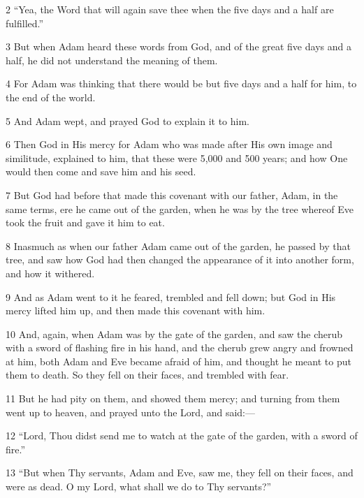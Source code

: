 \par 2 “Yea, the Word that will again save thee when the five days and a half are fulfilled.”

\par 3 But when Adam heard these words from God, and of the great five days and a half, he did not understand the meaning of them.

\par 4 For Adam was thinking that there would be but five days and a half for him, to the end of the world.

\par 5 And Adam wept, and prayed God to explain it to him.

\par 6 Then God in His mercy for Adam who was made after His own image and similitude, explained to him, that these were 5,000 and 500 years; and how One would then come and save him and his seed.

\par 7 But God had before that made this covenant with our father, Adam, in the same terms, ere he came out of the garden, when he was by the tree whereof Eve took the fruit and gave it him to eat.

\par 8 Inasmuch as when our father Adam came out of the garden, he passed by that tree, and saw how God had then changed the appearance of it into another form, and how it withered.

\par 9 And as Adam went to it he feared, trembled and fell down; but God in His mercy lifted him up, and then made this covenant with him.

\par 10 And, again, when Adam was by the gate of the garden, and saw the cherub with a sword of flashing fire in his hand, and the cherub grew angry and frowned at him, both Adam and Eve became afraid of him, and thought he meant to put them to death. So they fell on their faces, and trembled with fear.

\par 11 But he had pity on them, and showed them mercy; and turning from them went up to heaven, and prayed unto the Lord, and said:—

\par 12 “Lord, Thou didst send me to watch at the gate of the garden, with a sword of fire.”

\par 13 “But when Thy servants, Adam and Eve, saw me, they fell on their faces, and were as dead. O my Lord, what shall we do to Thy servants?”

